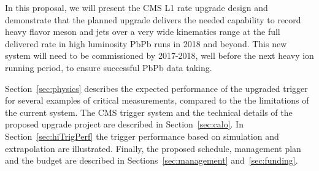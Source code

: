 In this proposal, we will present the CMS L1 rate upgrade design and demonstrate that the planned upgrade delivers 
the needed capability to record heavy flavor meson and jets over a very wide kinematics range at the full delivered rate in high luminosity 
PbPb runs in 2018 and beyond. This new system will need to be commissioned by 2017-2018, well before the next heavy ion running period,
to ensure successful PbPb data taking.  

Section~\ref{sec:physics} describes the expected performance of the upgraded 
trigger for several examples of critical measurements, compared to the the limitations of the current system. 
The CMS trigger system and the technical details of the proposed upgrade project are described in Section~\ref{sec:calo}. 
In Section~\ref{sec:hiTrigPerf} the trigger performance based on simulation and extrapolation are illustrated. Finally, 
the proposed schedule, management plan and the budget are described in Sections~\ref{sec:management} and~\ref{sec:funding}.

